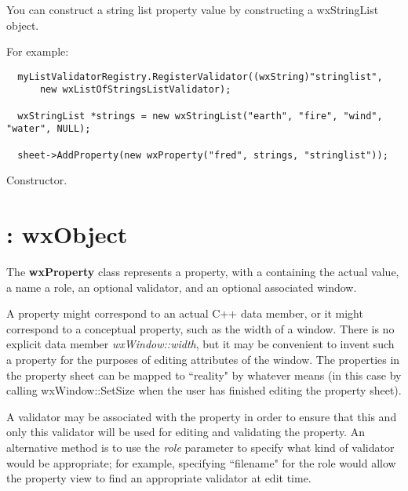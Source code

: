 You can construct a string list property value by constructing a wxStringList object.

For example:

\begin{verbatim}
  myListValidatorRegistry.RegisterValidator((wxString)"stringlist",
      new wxListOfStringsListValidator);

  wxStringList *strings = new wxStringList("earth", "fire", "wind", "water", NULL);

  sheet->AddProperty(new wxProperty("fred", strings, "stringlist"));
\end{verbatim}



Constructor.

\section{: wxObject}\label{wxproperty}

The {\bf wxProperty} class represents a property, with a \rtfsp
containing the actual value, a name a role, an optional validator, and
an optional associated window. 

A property might correspond to an actual C++ data member, or it
might correspond to a conceptual property, such as the width of a window.
There is no explicit data member {\it wxWindow::width}, but it may be convenient
to invent such a property for the purposes of editing attributes of the window.
The properties in the property sheet can be mapped to ``reality" by
whatever means (in this case by calling wxWindow::SetSize when the user has
finished editing the property sheet).

A validator may be associated with the property in order to ensure that this and
only this validator will be used for editing and validating the property.
An alternative method is to use the {\it role} parameter to specify what kind
of validator would be appropriate; for example, specifying ``filename" for the role
would allow the property view to find an appropriate validator at edit time.





